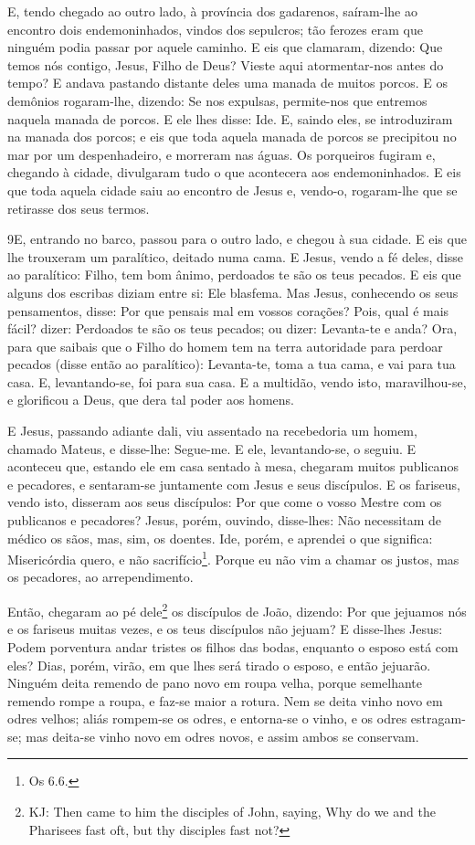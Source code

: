 E, tendo chegado ao outro lado, à província dos gadarenos,
saíram-lhe ao encontro dois endemoninhados, vindos dos sepulcros;
tão ferozes eram que ninguém podia passar por aquele caminho.
E eis que clamaram, dizendo: Que temos nós contigo, Jesus,
Filho de Deus? Vieste aqui atormentar-nos antes do tempo? E
andava pastando distante deles uma manada de muitos porcos. E
os demônios rogaram-lhe, dizendo: Se nos expulsas, permite-nos que
entremos naquela manada de porcos. E ele lhes disse: Ide. E,
saindo eles, se introduziram na manada dos porcos; e eis que toda
aquela manada de porcos se precipitou no mar por um despenhadeiro, e
morreram nas águas. Os porqueiros fugiram e, chegando à
cidade, divulgaram tudo o que acontecera aos endemoninhados.
E eis que toda aquela cidade saiu ao encontro de Jesus e,
vendo-o, rogaram-lhe que se retirasse dos seus termos.

\medskip

\lettrine{9} E, entrando no barco, passou para o outro lado, e
chegou à sua cidade. E eis que lhe trouxeram um paralítico, deitado
numa cama. E Jesus, vendo a fé deles, disse ao paralítico:
Filho, tem bom ânimo, perdoados te são os teus pecados. E eis
que alguns dos escribas diziam entre si: Ele blasfema. Mas
Jesus, conhecendo os seus pensamentos, disse: Por que pensais mal em
vossos corações? Pois, qual é mais fácil? dizer: Perdoados te
são os teus pecados; ou dizer: Levanta-te e anda? Ora, para que
saibais que o Filho do homem tem na terra autoridade para perdoar
pecados (disse então ao paralítico): Levanta-te, toma a tua cama, e
vai para tua casa. E, levantando-se, foi para sua casa. E a
multidão, vendo isto, maravilhou-se, e glorificou a Deus, que dera
tal poder aos homens.

E Jesus, passando adiante dali, viu assentado na recebedoria um
homem, chamado Mateus, e disse-lhe: Segue-me. E ele, levantando-se,
o seguiu. E aconteceu que, estando ele em casa sentado à
mesa, chegaram muitos publicanos e pecadores, e sen\-ta\-ram-se
juntamente com Jesus e seus discípulos. E os fariseus, vendo
isto, disseram aos seus discípulos: Por que come o vosso Mestre com
os publicanos e pecadores? Jesus, porém, ouvindo, disse-lhes:
Não necessitam de médico os sãos, mas, sim, os doentes. Ide,
porém, e aprendei o que significa: Misericórdia quero, e não
sacrifício\footnote{Os 6.6.}. Porque eu não vim a chamar os justos,
mas os pecadores, ao arrependimento.

Então, chegaram ao pé dele\footnote{KJ: Then came to him the
disciples of John, saying, Why do we and the Pharisees fast oft, but
thy disciples fast not?} os discípulos de João, dizendo: Por que
jejuamos nós e os fariseus muitas vezes, e os teus discípulos não
jejuam? E disse-lhes Jesus: Podem porventura andar tristes os
filhos das bodas, enquanto o esposo está com eles? Dias, porém,
virão, em que lhes será tirado o esposo, e então jejuarão.
Ninguém deita remendo de pano novo em roupa velha, porque
semelhante remendo rompe a roupa, e faz-se maior a rotura.
Nem se deita vinho novo em odres velhos; aliás rompem-se os
odres, e entorna-se o vinho, e os odres estragam-se; mas deita-se
vinho novo em odres novos, e assim ambos se conservam.

